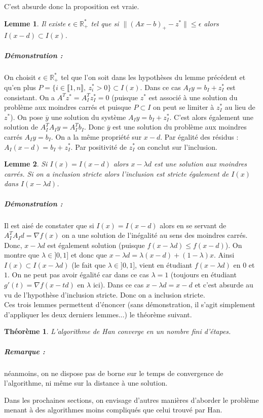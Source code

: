 \documentclass[10pt,a4paper]{article}
\newtheorem{thm}{Théorème}
\newtheorem{lemma}{Lemme}
\begin{document}
C'est absurde donc la proposition est vraie.
\begin{lemma}
Il existe $\epsilon \in \mathbb{R}_+^*$ tel que si $\| (Ax-b)_+ -z^*\| \le \epsilon$ alors $I(x-d) \subset I(x)$.
\end{lemma}
\subparagraph{Démonstration :} On choisit $\epsilon \in \mathbb{R}_+^*$ tel que l'on soit dans les hypothèses du lemme précédent et qu'en plus $P=\lbrace i \in \llbracket 1,n \rrbracket, \ z_i^* >0 \rbrace \subset I(x)$.
Dans ce cas $A_I y =b_I +z_I^*$ est consistant.
On a $A^T z^* =A_I^T z_I^* =0$ (puisque $z^*$ est associé à une solution du problème aux moindres carrés et puisque $P \subset I$ on peut se limiter à $z_I^*$ au lieu de $z^*$).
On pose $\overline{y}$ une solution du système $A_Iy=b_I+z_I^*$.  C'est alors également une solution de $A_I^TA_Iy=A_I^Tb_I$.
Donc $\overline{y}$ est une solution du problème aux moindres carrés $A_Iy=b_I$.
On a la même propriété sur $x-d$.
Par égalité des résidus : $A_I(x-d)=b_I+z_I^*$.
Par positivité de $z_I^*$ on conclut sur l'inclusion.
\begin{lemma}
Si $I(x)=I(x-d)$ alors $x-\lambda d$ est une solution aux moindres carrés.
Si on a inclusion stricte alors l'inclusion est stricte également de $I(x)$ dans $I(x-\lambda d)$.
\end{lemma}
\subparagraph{Démonstration :} Il est aisé de constater que si $I(x)=I(x-d)$ alors en se servant de $A_I^TA_I d= \nabla f(x)$ on a une solution de l'inégalité au sens des moindres carrés.
Donc, $x-\lambda d$ est également solution (puisque $f(x-\lambda d) \le f(x-d)$).
On montre que $\lambda \in ]0,1]$ et donc que $x-\lambda d= \lambda (x-d) +(1-\lambda) x$.
Ainsi $I(x) \subset I(x -\lambda d)$ (le fait que $\lambda \in ]0,1]$, vient en étudiant $f(x-\lambda d)$ en $0$ et $1$.
On ne peut pas avoir égalité car dans ce cas $\lambda=1$ (toujours en étudiant $g'(t)=\nabla f(x-td)$ en $\lambda$ ici).
Dans ce cas $x-\lambda d =x- d$ et c'est absurde au vu de l'hypothèse d'inclusion stricte.
Donc on a inclusion stricte.\\
Ces trois lemmes permettent d'énoncer (sans démonstration, il s'agit simplement d'appliquer les deux derniers lemmes...) le théorème suivant.
\begin{thm}
L'algorithme de Han converge en un nombre fini d'étapes.
\end{thm}
\subparagraph{Remarque :} néanmoins, on ne dispose pas de borne sur le temps de convergence de l'algorithme, ni même sur la distance à une solution.

Dans les prochaines sections, on envisage d'autres manières d'aborder le problème menant à des algorithmes moins compliqués que celui trouvé par Han.
\end{document}
